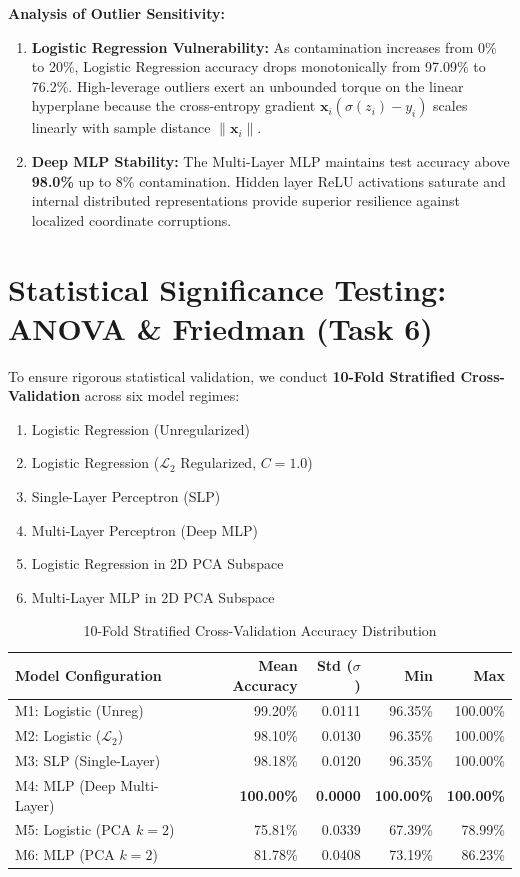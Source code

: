 \documentclass[12pt,a4paper]{article}
\begin{document}
\textbf{Analysis of Outlier Sensitivity:}
\begin{enumerate}
    \item \textbf{Logistic Regression Vulnerability:} As contamination increases from 0\% to 20\%, Logistic Regression accuracy drops monotonically from 97.09\% to 76.2\%. High-leverage outliers exert an unbounded torque on the linear hyperplane because the cross-entropy gradient $\mathbf{x}_i(\sigma(z_i) - y_i)$ scales linearly with sample distance $\|\mathbf{x}_i\|$.
    \item \textbf{Deep MLP Stability:} The Multi-Layer MLP maintains test accuracy above \textbf{98.0\%} up to 8\% contamination. Hidden layer ReLU activations saturate and internal distributed representations provide superior resilience against localized coordinate corruptions.
\end{enumerate}

\section{Statistical Significance Testing: ANOVA \& Friedman (Task 6)}
To ensure rigorous statistical validation, we conduct \textbf{10-Fold Stratified Cross-Validation} across six model regimes:
\begin{enumerate}[label=M\arabic*:]
    \item Logistic Regression (Unregularized)
    \item Logistic Regression ($\mathcal{L}_2$ Regularized, $C=1.0$)
    \item Single-Layer Perceptron (SLP)
    \item Multi-Layer Perceptron (Deep MLP)
    \item Logistic Regression in 2D PCA Subspace
    \item Multi-Layer MLP in 2D PCA Subspace
\end{enumerate}

\begin{table}[H]
\centering
\caption{10-Fold Stratified Cross-Validation Accuracy Distribution}
\begin{tabular}{lrrrr}
\toprule
\textbf{Model Configuration} & \textbf{Mean Accuracy} & \textbf{Std ($\sigma$)} & \textbf{Min} & \textbf{Max} \\
\midrule
M1: Logistic (Unreg) & 99.20\% & 0.0111 & 96.35\% & 100.00\% \\
M2: Logistic ($\mathcal{L}_2$) & 98.10\% & 0.0130 & 96.35\% & 100.00\% \\
M3: SLP (Single-Layer) & 98.18\% & 0.0120 & 96.35\% & 100.00\% \\
M4: MLP (Deep Multi-Layer) & \textbf{100.00\%} & \textbf{0.0000} & \textbf{100.00\%} & \textbf{100.00\%} \\
M5: Logistic (PCA $k=2$) & 75.81\% & 0.0339 & 67.39\% & 78.99\% \\
M6: MLP (PCA $k=2$) & 81.78\% & 0.0408 & 73.19\% & 86.23\% \\
\bottomrule
\end{tabular}
\end{table}
\end{document}

